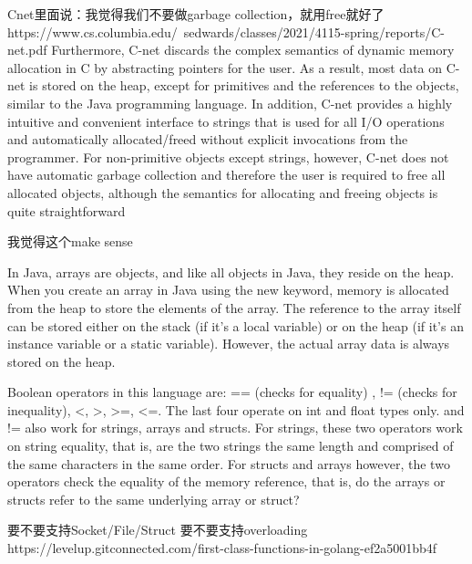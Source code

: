 \documentclass[11pt,A4]{article}
\begin{document}
Cnet里面说：我觉得我们不要做garbage collection，就用free就好了
https://www.cs.columbia.edu/~sedwards/classes/2021/4115-spring/reports/C-net.pdf
Furthermore, C-net discards the complex semantics of dynamic
memory allocation in C by abstracting pointers for the user. As a result, most data on C-net is
stored on the heap, except for primitives and the references to the objects, similar to the Java
programming language. In addition, C-net provides a highly intuitive and convenient interface to
strings that is used for all I/O operations and automatically allocated/freed without explicit
invocations from the programmer. For non-primitive objects except strings, however, C-net does
not have automatic garbage collection and therefore the user is required to free all allocated
objects, although the semantics for allocating and freeing objects is quite straightforward

我觉得这个make sense

In Java, arrays are objects, and like all objects in Java, they reside on the heap. When you create an array in Java using the new keyword, memory is allocated from the heap to store the elements of the array. The reference to the array itself can be stored either on the stack (if it's a local variable) or on the heap (if it's an instance variable or a static variable). However, the actual array data is always stored on the heap.

Boolean operators in this language are: == (checks for equality) , != (checks for inequality), <,
>, >=, <=. The last four operate on int and float types only. and != also work for strings,
arrays and structs. For strings, these two operators work on string equality, that is, are the two
strings the same length and comprised of the same characters in the same order. For structs
and arrays however, the two operators check the equality of the memory reference, that is, do
the arrays or structs refer to the same underlying array or struct?


要不要支持Socket/File/Struct
要不要支持overloading
https://levelup.gitconnected.com/first-class-functions-in-golang-ef2a5001bb4f


\end{document}
